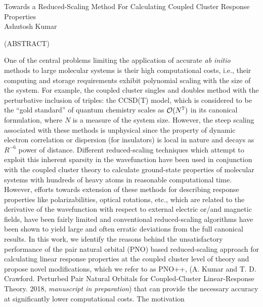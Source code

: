 \documentclass[12pt]{report}
\begin{document}
\thispagestyle{empty}
\begin{center}

{\Large
Towards a Reduced-Scaling Method For Calculating Coupled Cluster Response Properties 
}\\

\vspace{8em}
Ashutosh Kumar
\vspace{8em}


(ABSTRACT)


\end{center}
One of the central problems limiting the application of accurate {\em ab
initio} methods to large molecular systems is their high computational costs,
i.e., their computing and storage requirements exhibit polynomial scaling with
the size of the system. For example, the coupled cluster singles and doubles 
method with the perturbative inclusion of triples: the CCSD(T) model, 
which is considered to be the ``gold standard'' of quantum chemistry scales as 
${\cal O}(N^7)$ in its canonical formulation, where $N$ is a measure of the 
system size. However, the steep scaling associated with these methods is 
unphysical since the property of dynamic electron correlation or dispersion 
(for insulators) is local in nature and decays as $R^{-6}$ power of distance. 
Different reduced-scaling techniques which attempt to exploit this inherent 
sparsity in the wavefunction have been used in conjunction with the coupled cluster 
theory to calculate ground-state properties of molecular systems with hundreds of heavy atoms in reasonable computational time. 
However, efforts towards extension of these methods for describing response properties like polarizabilities, optical rotations, 
etc., which are related to the derivative of the wavefunction with respect to external electric or/and magnetic fields,
have been fairly limited and conventional reduced-scaling algorithms have been shown to yield large and often erratic deviations from 
the full canonical results. In this work, we identify the reasons behind 
the unsatisfactory performance of the pair natural orbital (PNO) based reduced-scaling 
approach for calculating linear response properties at the coupled cluster level of theory 
and propose novel modifications, which we refer to as PNO++, (A. Kumar and T. D. Crawford. Perturbed Pair 
Natural Orbitals for Coupled-Cluster Linear-Response Theory. 2018, {\em manuscript in preparation}) 
that can provide the necessary accuracy at significantly lower computational costs. The motivation 
\end{document}
